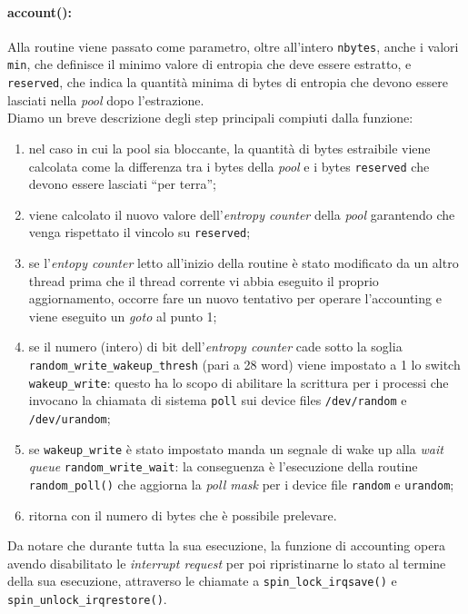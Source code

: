 \documentclass{article}
\begin{document}
 \paragraph{account():} Alla routine viene passato come parametro, oltre
 all'intero \verb+nbytes+, anche i valori \verb+min+, che definisce il minimo valore di
 entropia che deve essere estratto, e \verb+reserved+, che indica la quantità
 minima di bytes di entropia che devono essere lasciati nella \emph{pool} dopo
 l'estrazione. \\
 Diamo un breve descrizione degli step principali compiuti dalla funzione:
 \begin{enumerate}
   \item nel caso in cui la pool sia bloccante, la quantità di bytes estraibile
   viene calcolata come la differenza tra i bytes della \emph{pool} e i bytes
   \verb+reserved+ che devono essere lasciati ``per terra'';
   \item viene calcolato il nuovo valore dell'\emph{entropy counter} della
   \emph{pool} garantendo che venga rispettato il vincolo su \verb+reserved+;
   \item se l'\emph{entopy counter} letto all'inizio della routine è stato
   modificato da un altro thread prima che il thread corrente vi abbia eseguito
   il proprio aggiornamento, occorre fare un nuovo tentativo per operare
   l'accounting e viene eseguito un \emph{goto} al punto 1;
   \item se il numero (intero) di bit  dell'\emph{entropy counter} cade sotto
   la soglia \verb+random_write_wakeup_thresh+ (pari a 28 word) viene
   impostato a 1 lo switch \verb+wakeup_write+: questo ha lo scopo di abilitare 
   la scrittura per i processi che invocano la chiamata di sistema
   \verb+poll+ sui device files \verb+/dev/random+ e \verb+/dev/urandom+;
   \item se \verb+wakeup_write+ è stato impostato manda un segnale di wake up
   alla \emph{wait queue} \verb+random_write_wait+: la conseguenza è
   l'esecuzione della routine \verb+random_poll()+ che aggiorna la \emph{poll
   mask} per i device file \verb+random+ e \verb+urandom+;
   \item ritorna con il numero di bytes che è possibile prelevare.
 \end{enumerate} 
 Da notare che durante tutta la sua esecuzione, la funzione di accounting opera
 avendo disabilitato le \emph{interrupt request} per poi ripristinarne lo stato
 al termine della sua esecuzione, attraverso le chiamate a
 \verb+spin_lock_irqsave()+ e \verb+spin_unlock_irqrestore()+.
 
\end{document}
